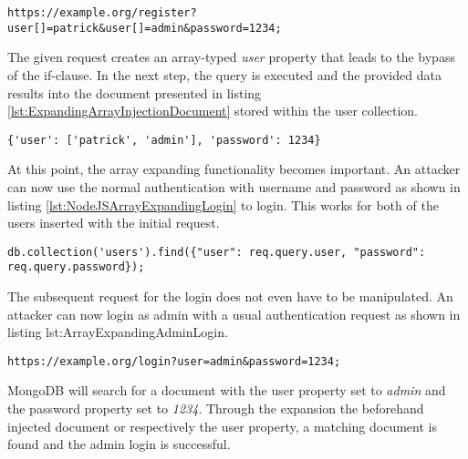 \begin{lstlisting}[caption={Attack vector on MongoDB for expanding array injection via the query-string parameter}, label={lst:ExpandingArrayInjection}]
https://example.org/register?user[]=patrick&user[]=admin&password=1234;
\end{lstlisting}

The given request creates an array-typed \emph{user} property that leads to the bypass of the if-clause. In the next step, the query is executed and the provided data results into the document presented in listing \ref{lst:ExpandingArrayInjectionDocument} stored within the user collection.\\

\begin{lstlisting}[caption={Resulting parameter for expanding array injection}, label={lst:ExpandingArrayInjectionDocument}]
{'user': ['patrick', 'admin'], 'password': 1234}
\end{lstlisting}

At this point, the array expanding functionality becomes important. An attacker can now use the normal authentication with username and password as shown in listing \ref{lst:NodeJSArrayExpandingLogin} to login. This works for both of the users inserted with the initial request. \\

\begin{lstlisting}[caption={Login example affected by the preceding expanding array injection}, label={lst:NodeJSArrayExpandingLogin}]
db.collection('users').find({"user": req.query.user, "password": req.query.password});
\end{lstlisting}

The subsequent request for the login does not even have to be manipulated. An attacker can now login as admin with a usual authentication request as shown in listing {lst:ArrayExpandingAdminLogin}.\\

\begin{lstlisting}[caption={Usual login request exploiting the injected user array}, label={lst:ArrayExpandingAdminLogin}]
https://example.org/login?user=admin&password=1234;
\end{lstlisting}

MongoDB will search for a document with the user property set to \emph{admin} and the password property set to \emph{1234}. Through the expansion the beforehand injected document or respectively the user property, a matching document is found and the admin login is successful.\\

